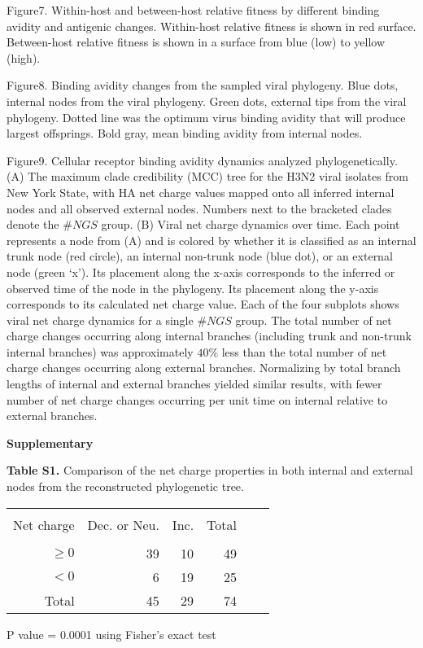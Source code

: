 \documentclass[12pt,a4paper]{article}
\begin{document}
Figure7. Within-host and between-host relative fitness by different binding avidity and antigenic  changes. Within-host relative fitness is shown in red surface. Between-host relative fitness is shown in a surface from blue (low) to yellow (high).

Figure8. Binding avidity changes from the sampled viral phylogeny. Blue dots, internal nodes from the viral phylogeny. Green dots, external tips from the viral phylogeny. Dotted line was the optimum virus binding avidity that will produce largest offsprings. Bold gray, mean binding avidity from internal nodes.

Figure9. Cellular receptor binding avidity dynamics analyzed phylogenetically. (A) The maximum clade credibility (MCC) tree for the H3N2 viral isolates from New York State, with HA net charge values mapped onto all inferred internal nodes and all observed external nodes. Numbers next to the bracketed clades denote the $\#NGS$ group. (B) Viral net charge dynamics over time. Each point represents a node from (A) and is colored by whether it is classified as an internal trunk node (red circle), an internal non-trunk node (blue dot), or an external node (green ‘x’). Its placement along the x-axis corresponds to the inferred or observed time of the node in the phylogeny. Its placement along the y-axis corresponds to its calculated net charge value. Each of the four subplots shows viral net charge dynamics for a single $\#NGS$ group. The total number of net charge changes occurring along internal branches (including trunk and non-trunk internal branches) was approximately $40\%$ less than the total number of net charge changes occurring along external branches. Normalizing by total branch lengths of internal and external branches yielded similar results, with fewer number of net charge changes occurring per unit time on internal relative to external branches.
\clearpage




{\bf Supplementary}
\clearpage

\begin{table}
{\bf Table S1.} Comparison of the net charge properties in both internal and external nodes from the reconstructed phylogenetic tree.

\begin{tabular*}{10cm}{rrrrrr}
\hline\hline \\%


Net charge&  Dec. or Neu. &  Inc. & Total  & \\
\hline \\ %
$ \geq 0$ &  39           &  10   & 49     &  \\
$ < 0$ &   6           &  19   & 25     &  \\
Total  &  45           &  29   & 74   &  \\
\hline %
\end{tabular*}
\end{table}
P value = 0.0001 using Fisher's exact test
\end{document}
